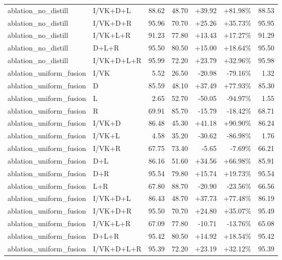 \documentclass[UTF8,10pt,a4paper]{ctexart}
\newcommand{\better}[1]{\textcolor{ImpBlue}{#1}}
\newcommand{\worse}[1]{\textcolor{DropRed}{#1}}
\begin{document}
{\begin{longtable}{llrrrrr}
ablation\_no\_distill & I/VK+D+L & 88.62 & 48.70 & \better{+39.92} & \better{+81.98\%} & 88.53\\
ablation\_no\_distill & I/VK+D+R & 95.96 & 70.70 & \better{+25.26} & \better{+35.73\%} & 95.95\\
ablation\_no\_distill & I/VK+L+R & 91.23 & 77.80 & \better{+13.43} & \better{+17.27\%} & 91.29\\
ablation\_no\_distill & D+L+R & 95.50 & 80.50 & \better{+15.00} & \better{+18.64\%} & 95.50\\
ablation\_no\_distill & I/VK+D+L+R & 95.99 & 72.20 & \better{+23.79} & \better{+32.96\%} & 95.98\\
ablation\_uniform\_fusion & I/VK & 5.52 & 26.50 & \worse{-20.98} & \worse{-79.16\%} & 1.32\\
ablation\_uniform\_fusion & D & 85.59 & 48.10 & \better{+37.49} & \better{+77.93\%} & 85.30\\
ablation\_uniform\_fusion & L & 2.65 & 52.70 & \worse{-50.05} & \worse{-94.97\%} & 1.55\\
ablation\_uniform\_fusion & R & 69.91 & 85.70 & \worse{-15.79} & \worse{-18.42\%} & 68.71\\
ablation\_uniform\_fusion & I/VK+D & 86.48 & 45.30 & \better{+41.18} & \better{+90.90\%} & 86.24\\
ablation\_uniform\_fusion & I/VK+L & 4.58 & 35.20 & \worse{-30.62} & \worse{-86.98\%} & 1.76\\
ablation\_uniform\_fusion & I/VK+R & 67.75 & 73.40 & \worse{-5.65} & \worse{-7.69\%} & 66.21\\
ablation\_uniform\_fusion & D+L & 86.16 & 51.60 & \better{+34.56} & \better{+66.98\%} & 85.91\\
ablation\_uniform\_fusion & D+R & 95.54 & 79.80 & \better{+15.74} & \better{+19.73\%} & 95.54\\
ablation\_uniform\_fusion & L+R & 67.80 & 88.70 & \worse{-20.90} & \worse{-23.56\%} & 66.56\\
ablation\_uniform\_fusion & I/VK+D+L & 86.43 & 48.70 & \better{+37.73} & \better{+77.48\%} & 86.19\\
ablation\_uniform\_fusion & I/VK+D+R & 95.50 & 70.70 & \better{+24.80} & \better{+35.07\%} & 95.49\\
ablation\_uniform\_fusion & I/VK+L+R & 67.09 & 77.80 & \worse{-10.71} & \worse{-13.76\%} & 65.08\\
ablation\_uniform\_fusion & D+L+R & 95.42 & 80.50 & \better{+14.92} & \better{+18.54\%} & 95.42\\
ablation\_uniform\_fusion & I/VK+D+L+R & 95.39 & 72.20 & \better{+23.19} & \better{+32.12\%} & 95.39\\
\bottomrule
\end{longtable}
}
\end{document}
